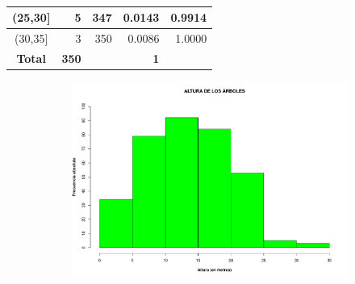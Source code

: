 \documentclass[11pt]{article}
\begin{document}
\begin{table}[h!]
\begin{center}
\begin{tabular}{| c | r | r | r | r |}
      (25,30]                                                               & 5            & 347 & 0.0143     & 0.9914 \\ \hline
      (30,35]                                                               & 3            & 350 & 0.0086     & 1.0000 \\ \hline
      \textbf{Total}                                                        & \textbf{350} &     & \textbf{1} &        \\ \hline
    \end{tabular}
    \caption{}
    \label{tab:tablaAltura}
  \end{center}
\end{table}

\begin{figure}[h!]
  \begin{center}
    \begin{subfigure}[b]{0.9\linewidth}
      \includegraphics[width=\linewidth]{histAltura.pdf}
      \caption{}
      \label{fig:histAltura}
    \end{subfigure}
  \end{center}
\end{figure}

\newpage
\end{document}
